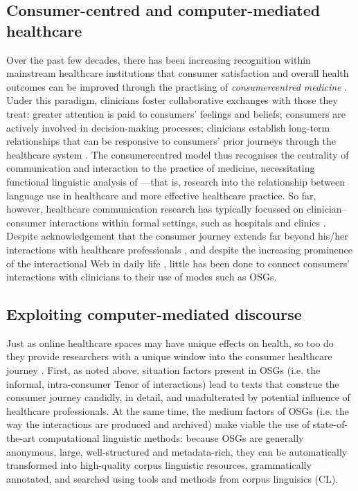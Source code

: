 \subsection{Consumer-centred and computer-mediated healthcare}

Over the past few decades, there has been increasing recognition within mainstream healthcare institutions that consumer satisfaction and overall health outcomes can be improved through the practising of \emph{\gls{consumercentred} medicine} \cite{stewart_effective_1995}. Under this paradigm, clinicians foster collaborative exchanges with those they treat: greater attention is paid to consumers' feelings and beliefs; consumers are actively involved in decision\hyp{}making processes; clinicians establish long\hyp{}term relationships that can be responsive to consumers' prior journeys through the healthcare system \cite{woodward-kron_international_2016}. The \gls{consumercentred} model thus recognises the centrality of communication and interaction to the practice of medicine, necessitating functional linguistic analysis of ---that is, research into the relationship between language use in healthcare and more effective healthcare practice. So far, however, healthcare communication research has typically focussed on clinician--consumer interactions within formal settings, such as hospitals and clinics \cite{slade_communicating_2015}. Despite acknowledgement that the consumer journey extends far beyond his\slash her interactions with healthcare professionals \cite{balka_situating_2010,dickerson_cancer_2011}, and despite the increasing prominence of the interactional Web in daily life \cite{hadlington_cognitive_2015}, little has been done to connect \glspl{consumer}' interactions with clinicians to their use of  \glspl{mode} such as \glspl{OSG}.

\subsection{Exploiting computer-mediated discourse}

Just as online healthcare spaces may have unique effects on health, so too do they provide researchers with a unique window into the consumer healthcare journey \cite{harvey_disclosures_2012}. First, as noted above, situation factors present in \glspl{OSG} (i.e. the informal, intra\hyp{}consumer Tenor of interactions) lead to texts that construe the consumer journey candidly, in detail, and unadulterated by potential influence of healthcare professionals. At the same time, the medium factors of \glspl{OSG} (i.e. the way the interactions are produced and archived) make viable the use of state\hyp{}of\hyp{}the\hyp{}art computational linguistic methods: because \glspl{OSG} are generally anonymous, large, well\hyp{}structured and metadata\hyp{}rich, they can be automatically transformed into high\hyp{}quality corpus linguistic resources, grammatically annotated, and searched using tools and methods from corpus linguisics (\gls{CL}). 

